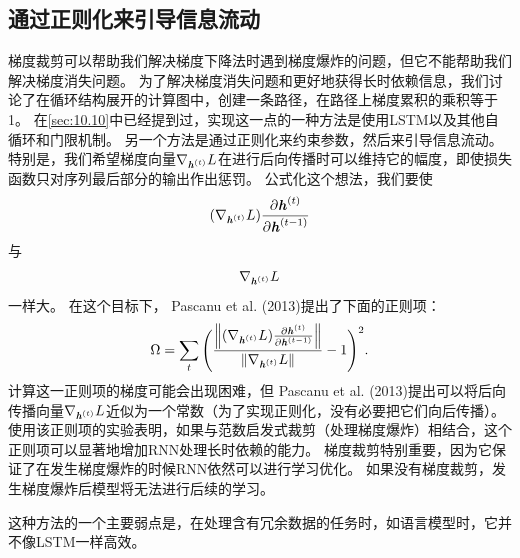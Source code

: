 \subsection{通过正则化来引导信息流动}
\label{sec:10.11.2}
梯度裁剪可以帮助我们解决梯度下降法时遇到梯度爆炸的问题，但它不能帮助我们解决梯度消失问题。
为了解决梯度消失问题和更好地获得长时依赖信息，我们讨论了在循环结构展开的计算图中，创建一条路径，在路径上梯度累积的乘积等于1。
在\ref{sec:10.10}中已经提到过，实现这一点的一种方法是使用LSTM以及其他自循环和门限机制。
另一个方法是通过正则化来约束参数，然后来引导信息流动。
特别是，我们希望梯度向量$\nabla_{\boldsymbol{\mathit{h}}^{(t)}} L$在进行后向传播时可以维持它的幅度，即使损失函数只对序列最后部分的输出作出惩罚。
公式化这个想法，我们要使
\begin{align}
 (\nabla_{\boldsymbol{\mathit{h}}^{(t)}} L) \frac{\partial \boldsymbol{\mathit{h}}^{(t)}}{\partial \boldsymbol{\mathit{h}}^{(t-1)}}
\end{align}
与
\begin{align}
\nabla_{\boldsymbol{\mathit{h}}^{(t)}} L 
\end{align}
一样大。
在这个目标下， Pascanu et al. (2013)提出了下面的正则项：
\begin{align}
 \Omega = \sum_t \Bigg(  \frac{
 \left\lVert (\nabla_{\boldsymbol{\mathit{h}}^{(t)}} L) \frac{\partial \boldsymbol{\mathit{h}}^{(t)}}{\partial \boldsymbol{\mathit{h}}^{(t-1)}}\right\rVert}
 {\left\lVert\nabla_{\boldsymbol{\mathit{h}}^{(t)}} L\right\rVert} -1 \Bigg)^2.
\end{align}
计算这一正则项的梯度可能会出现困难，但 Pascanu et al. (2013)提出可以将后向传播向量$\nabla_{\boldsymbol{\mathit{h}}^{(t)}} L$近似为一个常数（为了实现正则化，没有必要把它们向后传播）。
使用该正则项的实验表明，如果与范数启发式裁剪（处理梯度爆炸）相结合，这个正则项可以显著地增加RNN处理长时依赖的能力。
梯度裁剪特别重要，因为它保证了在发生梯度爆炸的时候RNN依然可以进行学习优化。
如果没有梯度裁剪，发生梯度爆炸后模型将无法进行后续的学习。

这种方法的一个主要弱点是，在处理含有冗余数据的任务时，如语言模型时，它并不像LSTM一样高效。



